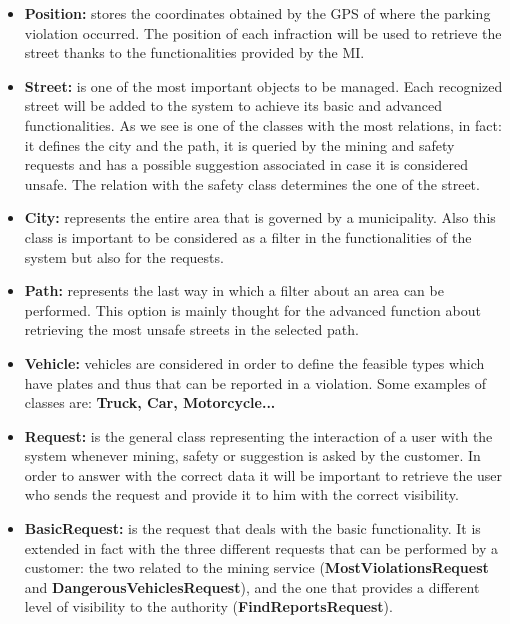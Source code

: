 \begin{itemize}
		\item \textbf{Position:} stores the coordinates obtained by the GPS of where the parking violation occurred. The position of each infraction will be used to retrieve the street thanks to the functionalities provided by the MI.
		
		\item \textbf{Street:} is one of the most important objects to be managed. Each recognized street will be added to the system to achieve its basic and advanced functionalities. As we see is one of the classes with the most relations, in fact: it defines the city and the path, it is queried by the mining and safety requests and has a possible suggestion associated in case it is considered unsafe. The relation with the safety class determines the one of the street.
		
		\item \textbf{City:} represents the entire area that is governed by a municipality. Also this class is important to be considered as a filter in the functionalities of the system but also for the requests.
		
		\item \textbf{Path:} represents the last way in which a filter about an area can be performed. This option is mainly thought for the advanced function about retrieving the most unsafe streets in the selected path.
		
		\item \textbf{Vehicle:} vehicles are considered in order to define the feasible types which have plates and thus that can be reported in a violation. Some examples of classes are: \textbf{Truck, Car, Motorcycle...}
		
		\item \textbf{Request:} is the general class representing the interaction of a user with the system whenever mining, safety or suggestion is asked by the customer. In order to answer with the correct data it will be important to retrieve the user who sends the request and provide it to him with the correct visibility.
		
		\item \textbf{BasicRequest:} is the request that deals with the basic functionality. It is extended in fact with the three different requests that can be performed by a customer: the two related to the mining service (\textbf{MostViolationsRequest} and \textbf{DangerousVehiclesRequest}), and the one that provides a different level of visibility to the authority (\textbf{FindReportsRequest}).
		

\end{itemize}
